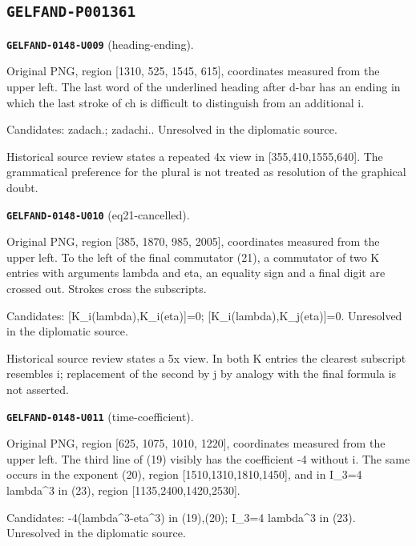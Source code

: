 \documentclass[11pt]{article}
\theoremstyle{definition}
\theoremstyle{remark}
\begin{document}
\subsection*{\texttt{GELFAND-P001361}}
\noindent\leavevmode{}\label{GELFAND-P001361:heading-ending:note}\textbf{\texttt{GELFAND-0148-U009}} (heading-ending).\par\nopagebreak[4]
Original PNG, region [1310, 525, 1545, 615], coordinates measured from the upper left. The last word of the underlined heading after d-bar has an ending in which the last stroke of ch is difficult to distinguish from an additional i.\par
Candidates: zadach.; zadachi.. Unresolved in the diplomatic source.\par
Historical source review states a repeated 4x view in [355,410,1555,640]. The grammatical preference for the plural is not treated as resolution of the graphical doubt.\par\medskip
\noindent\leavevmode{}\label{GELFAND-P001361:eq21-cancelled:note}\textbf{\texttt{GELFAND-0148-U010}} (eq21-cancelled).\par\nopagebreak[4]
Original PNG, region [385, 1870, 985, 2005], coordinates measured from the upper left. To the left of the final commutator (21), a commutator of two K entries with arguments lambda and eta, an equality sign and a final digit are crossed out. Strokes cross the subscripts.\par
Candidates: [K\_i(lambda),K\_i(eta)]=0; [K\_i(lambda),K\_j(eta)]=0. Unresolved in the diplomatic source.\par
Historical source review states a 5x view. In both K entries the clearest subscript resembles i; replacement of the second by j by analogy with the final formula is not asserted.\par\medskip
\noindent\leavevmode{}\label{GELFAND-P001361:time-coefficient:note}\textbf{\texttt{GELFAND-0148-U011}} (time-coefficient).\par\nopagebreak[4]
Original PNG, region [625, 1075, 1010, 1220], coordinates measured from the upper left. The third line of (19) visibly has the coefficient -4 without i. The same occurs in the exponent (20), region [1510,1310,1810,1450], and in I\_3=4 lambda\textasciicircum{}3 in (23), region [1135,2400,1420,2530].\par
Candidates: -4(lambda\textasciicircum{}3-eta\textasciicircum{}3) in (19),(20); I\_3=4 lambda\textasciicircum{}3 in (23). Unresolved in the diplomatic source.\par
\end{document}
